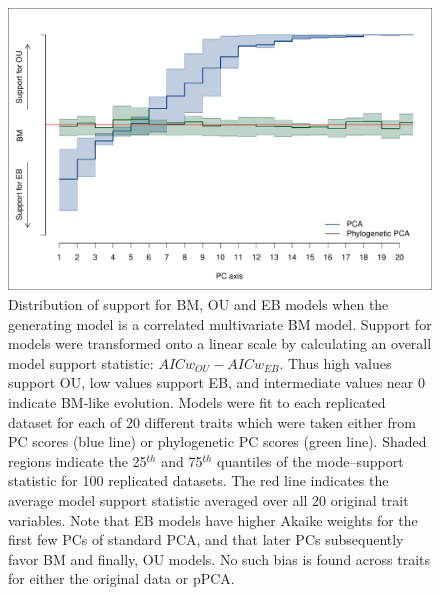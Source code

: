 \documentclass[a4paper,11pt]{article}
\begin{document}
\begin{figure}[p]
\centering
\includegraphics[scale=0.65]{./fig/mv-bm-aic.pdf}
\caption{Distribution of support for BM, OU and EB models when the generating model is a correlated multivariate BM model. Support for models were transformed onto a linear scale by calculating an overall model support statistic: $AICw_{OU} - AICw_{EB}$. Thus high values support OU, low values support EB, and intermediate values near 0 indicate BM-like evolution. Models were fit to each replicated dataset for each of 20 different traits which were taken either from PC scores (blue line) or phylogenetic PC scores (green line). Shaded regions indicate the 25$^{th}$ and 75$^{th}$ quantiles of the mode--support statistic for  100 replicated datasets. The red line indicates the average model support statistic averaged over all 20 original trait variables. Note that EB models have higher Akaike weights for the first few PCs of standard PCA, and that later PCs subsequently favor BM and finally, OU models. No such bias is found across traits for either the original data or pPCA.}
\label{corbm}
\end{figure}
\end{document}
